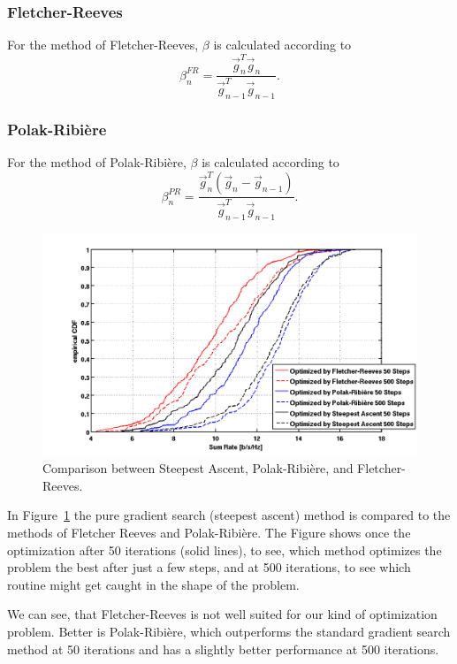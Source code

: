 \subsubsection{Fletcher-Reeves}
For the method of Fletcher-Reeves, $\beta$ is calculated according to~\cite{Fletcher64}
\begin{equation}
\beta_n^{FR} = \frac{\vec{g}_n^T \vec{g}_n}{\vec{g}_{n-1}^T \vec{g}_{n-1}}.
\label{eq:beta_fr}
\end{equation}

\subsubsection{Polak-Ribi\`{e}re}
For the method of Polak-Ribi\`{e}re, $\beta$ is calculated according to~\cite{Polak69}
\begin{equation}
\beta_n^{PR} = \frac{\vec{g}_n^T\left(\vec{g}_n-\vec{g}_{n-1}\right)}{\vec{g}_{n-1}^T \vec{g}_{n-1}}.
\label{eq:beta_fr}
\end{equation}

\begin{figure}[h]
\centering
  \includegraphics[width=0.8\linewidth]{images/Conjgradcomparison_edited.png}
\caption{Comparison between Steepest Ascent, Polak-Ribi\`{e}re, and Fletcher-Reeves.}
\label{fig:pr_fr_sa}
\end{figure}

In Figure~\ref{fig:pr_fr_sa} the pure gradient search (steepest ascent) method is compared to the methods of Fletcher Reeves and Polak-Ribi\`{e}re.
The Figure shows once the optimization after 50 iterations (solid lines), to see, which method optimizes the problem the best after just a few steps, and at 500 iterations, to see which routine might get caught in the shape  of the problem.


We can see, that Fletcher-Reeves is not well suited for our kind of optimization problem.
Better is Polak-Ribi\`{e}re, which outperforms the standard gradient search method at 50 iterations and has a slightly better performance at 500 iterations.



